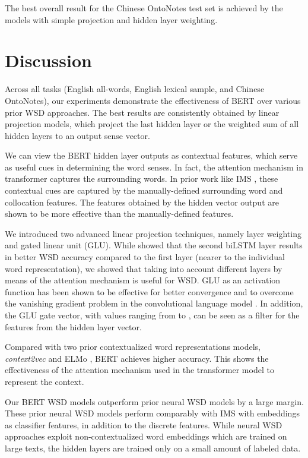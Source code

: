 \documentclass[11pt,a4paper]{article}
\begin{document}
The best overall result for the Chinese OntoNotes test set is achieved by the models with simple projection and hidden layer weighting.

\section{Discussion}
\label{sec:discussion}

Across all tasks (English all-words, English lexical sample, and Chinese OntoNotes), our experiments demonstrate the effectiveness of BERT over various prior WSD approaches. The best results are consistently obtained by linear projection models, which project the last hidden layer or the weighted sum of all hidden layers to an output sense vector.

We can view the BERT hidden layer outputs as contextual features, which serve as useful cues in determining the word senses. In fact, the attention mechanism in transformer captures the surrounding words. In prior work like IMS \cite{zhong_it_2010}, these contextual cues are captured by the manually-defined surrounding word and collocation features. The features obtained by the hidden vector output are shown to be more effective than the manually-defined features. 

We introduced two advanced linear projection techniques, namely layer weighting and gated linear unit (GLU). While \citet{peters_deep_2018} showed that the second biLSTM layer results in better WSD accuracy compared to the first layer (nearer to the individual word representation), we showed that taking into account different layers by means of the attention mechanism is useful for WSD. GLU as an activation function has been shown to be effective for better convergence and to overcome the vanishing gradient problem in the convolutional language model \cite{dauphin_language_2017}. In addition, the GLU gate vector, with values ranging from  to , can be seen as a filter for the features from the hidden layer vector. 

Compared with two prior contextualized word representations models, \textit{context2vec} \cite{melamud_context2vec:_2016} and ELMo \cite{peters_deep_2018}, BERT achieves higher accuracy. This shows the effectiveness of the attention mechanism used in the transformer model to represent the context.

Our BERT WSD models outperform prior neural WSD models by a large margin. These prior neural WSD models perform comparably with IMS with embeddings as classifier features, in addition to the discrete features. While neural WSD approaches \cite{kageback_word_2016,raganato_neural_2017,luo_incorporating_2018} exploit non-contextualized word embeddings which are trained on large texts, the hidden layers are trained only on a small amount of labeled data. 
\end{document}
